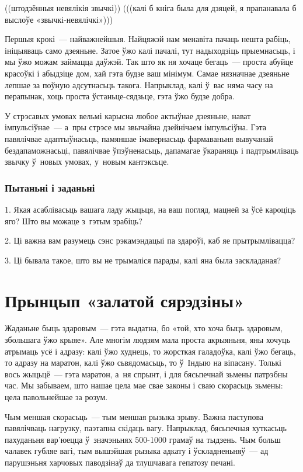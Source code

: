 ((штодзённыя невялікія звычкі)) (((калі б кніга была для дзяцей, я прапанавала б выслоўе «звычкі-невялічкі»)))

Першыя крокі~--- найважнейшыя. Найцяжэй нам менавіта пачаць нешта рабіць, ініцыяваць само дзеяньне. Затое ўжо калі пачалі, тут надыходзіць прыемнасьць, і мы ўжо можам займацца даўжэй. Так што як ня хочаце бегаць~--- проста абуйце красоўкі і абыдзіце дом, хай гэта будзе ваш мінімум. Самае нязначнае дзеяньне лепшае за поўную адсутнасьць такога. Напрыклад, калі ў~вас няма часу на перапынак, хоць проста ўстаньце-сядзьце, гэта ўжо будзе добра.

У стрэсавых умовах вельмі карысна любое актыўнае дзеяньне, нават імпульсіўнае~--- а~пры стрэсе мы звычайна дзейнічаем імпульсіўна. Гэта павялічвае адаптыўнасьць, памяншае імавернасьць фармаваньня вывучанай бездапаможнасьці, павялічвае ўпэўненасьць, дапамагае ўкараняць і падтрымліваць звычку ў~новых умовах, у~новым кантэксьце.

\subsubsection{Пытаньні і заданьні}

1. Якая асаблівасьць вашага ладу жыцьця, на ваш погляд, мацней за ўсё кароціць яго? Што вы можаце з~гэтым зрабіць?

2. Ці важна вам разумець сэнс рэкамэндацыі па здароўі, каб яе прытрымлівацца?

3. Ці бывала такое, што вы не трымаліся парады, калі яна была заскладаная?


\section{Прынцып «залатой сярэдзіны»}

Жаданьне быць здаровым~--- гэта выдатна, бо «той, хто хоча быць здаровым, збольшага ўжо крыяе». Але многім людзям мала проста акрыяньня, яны хочуць атрымаць усё і адразу: калі ўжо худнець, то жорсткая галадоўка, калі ўжо бегаць, то адразу на маратон, калі ўжо сьвядомасьць, то ў~Індыю на віпасану. Толькі вось жыцьцё~--- гэта маратон, а~ня спрынт, і для бясьпечнай зьмены патрэбны час. Мы забываем, што нашае цела мае свае законы і сваю скорасьць зьмены: цела павольнейшае за розум.

Чым меншая скорасьць~--- тым меншая рызыка зрыву. Важна паступова павялічваць нагрузку, паэтапна скідаць вагу. Напрыклад, бясьпечная хуткасьць пахуданьня вар'юецца ў~значэньнях 500-1000 грамаў на тыдзень. Чым больш чалавек губляе вагі, тым вышэйшая рызыка адкату і ўскладненьняў~--- ад парушэньня харчовых паводзінаў да тлушчавага гепатозу печані.

